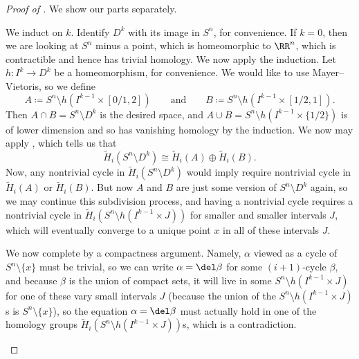 \documentclass[../notes.tex]{subfiles}
\begin{document}
\begin{proof}[Proof of ]
	We show our parts separately.
	\begin{listalph}
		\item We induct on $k$. Identify $D^k$ with its image in $S^n$, for convenience. If $k=0$, then we are looking at $S^n$ minus a point, which is homeomorphic to $\RR^n$, which is contractible and hence has trivial homology. We now apply the induction. Let $h\colon I^k\to D^k$ be a homeomorphism, for convenience. We would like to use Mayer--Vietoris, so we define
		\[A\coloneqq S^n\setminus h\left(I^{k-1}\times[0/1,2]\right)\qquad\text{and}\qquad B\coloneqq S^n\setminus h\left(I^{k-1}\times[1/2,1]\right).\]
		Then $A\cap B=S^n\setminus D^k$ is the desired space, and $A\cup B=S^n\setminus h\left(I^{k-1}\times\{1/2\}\right)$ is of lower dimension and so has vanishing homology by the induction. We now may apply , which tells us that
		\[\widetilde H_i\left(S^n\setminus D^k\right)\cong\widetilde H_i(A)\oplus\widetilde H_i(B).\]
		Now, any nontrivial cycle in $\widetilde H_i\left(S^n\setminus D^k\right)$ would imply require nontrivial cycle in $\widetilde H_i\left(A\right)$ or $\widetilde H_i\left(B\right)$. But now $A$ and $B$ are just some version of $S^n\setminus D^k$ again, so we may continue this subdivision process, and having a nontrivial cycle requires a nontrivial cycle in $\widetilde H_i\left(S^n\setminus h\left(I^{k-1}\times J\right)\right)$ for smaller and smaller intervals $J$, which will eventually converge to a unique point $x$ in all of these intervals $J$.
		
		We now complete by a compactness argument. Namely, $\alpha$ viewed as a cycle of $S^n\setminus\{x\}$ must be trivial, so we can write $\alpha=\del\beta$ for some $(i+1)$-cycle $\beta$, and because $\beta$ is the union of compact sets, it will live in some $S^n\setminus h\left(I^{k-1}\times J\right)$ for one of these vary small intervals $J$ (because the union of the $S^n\setminus h\left(I^{k-1}\times J\right)$s is $S^n\setminus\{x\}$), so the equation $\alpha=\del\beta$ must actually hold in one of the homology groups $\widetilde H_i\left(S^n\setminus h\left(I^{k-1}\times J\right)\right)$s, which is a contradiction.


\end{listalph}
\end{proof}
\end{document}
